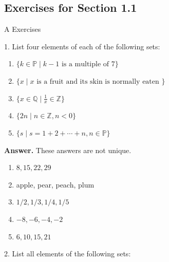 \documentclass[10pt,]{book}
\theoremstyle{plain}
\theoremstyle{definition}
\theoremstyle{definition}
\theoremstyle{definition}
\theoremstyle{definition}
\numberwithin{equation}{section}
\begin{document}
\subsection[Exercises for Section 1.1 ]{Exercises for Section 1.1 }\label{exercises-1}
\hypertarget{exercisegroup-1}{}\typeout{************************************************}
\typeout{************************************************}
A Exercises%
\begin{exercisegroup}
\item[1.]\hypertarget{exercise-1}{}List four elements of each of the following sets:%
\par
\leavevmode%
\begin{enumerate}[label=\alph*]
\item\hypertarget{li-15}{} \(\{k \in  \mathbb{P} \mid {k - 1} \textrm{ is a multiple of 7}\}\) %
\item\hypertarget{li-16}{} \(\{x \mid x \textrm{ is a fruit and its skin is normally eaten }\}\)%
\item\hypertarget{li-17}{}\(\{x \in \mathbb{Q}\mid \frac{1}{x} \in \mathbb{Z}\}\)%
\item\hypertarget{li-18}{} \(\{2n \mid n \in \mathbb{Z}, n < 0 \}\)%
\item\hypertarget{li-19}{} \(\{s \mid s = 1 + 2 + \cdots  + n, n \in \mathbb{P}\}\)%
\end{enumerate}
%
\par\smallskip
\par\smallskip
\noindent\textbf{Answer.}\hypertarget{answer-1}{}\quad
These answers are not unique.%
\par
\leavevmode%
\begin{multicols}{3}
\begin{enumerate}[label=\alph*]
\item\hypertarget{li-20}{} \(8, 15, 22, 29\)%
\item\hypertarget{li-21}{} apple, pear, peach, plum %
\item\hypertarget{li-22}{} \(1/2, 1/3, 1/4, 1/5\)%
\item\hypertarget{li-23}{} \(-8, -6, -4, -2\)%
\item\hypertarget{li-24}{}\(6, 10, 15, 21\)%
\end{enumerate}
\end{multicols}
%
\item[2.]\hypertarget{exercise-2}{} List all elements of the following sets:%
\par
\leavevmode%
\begin{enumerate}[label=\alph*]

\end{enumerate}
\end{exercisegroup}
\end{document}
